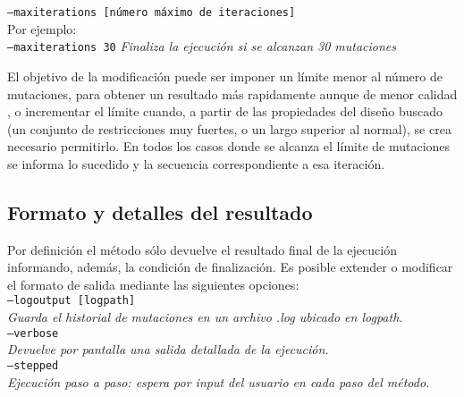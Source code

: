 \indent \texttt{--maxiterations [número máximo de iteraciones]} 
\\Por ejemplo: \\
\indent \texttt{--maxiterations 30} \hspace{0.5cm} \textit{Finaliza la ejecución si se alcanzan 30 mutaciones}


El objetivo de la modificación puede ser imponer un límite menor al número de mutaciones, para obtener un resultado más rapidamente aunque de menor calidad , 
o incrementar el límite cuando, a partir de las propiedades del diseño buscado (un conjunto de restricciones muy fuertes, o un largo superior al normal), se crea necesario permitirlo.
En todos los casos donde se alcanza el límite de mutaciones se informa lo sucedido y la secuencia correspondiente a esa iteración. 

\subsection{Formato y detalles del resultado}\label{output}

Por definición el método sólo devuelve el resultado final de la ejecución informando, además, la condición de finalización.
Es posible extender o modificar el formato de salida mediante las siguientes opciones:
\vspace{0.2cm}\\
\indent \texttt{--logoutput [logpath]} \\
\indent \indent \textit{Guarda el historial de mutaciones en un archivo .log ubicado en logpath.} \\
\indent \texttt{--verbose} \\
\indent \indent \textit{Devuelve por pantalla una salida detallada de la ejecución.} \\
\indent \texttt{--stepped} \\
\indent \indent \textit{Ejecución paso a paso: espera por input del usuario en cada paso del método.} \\
